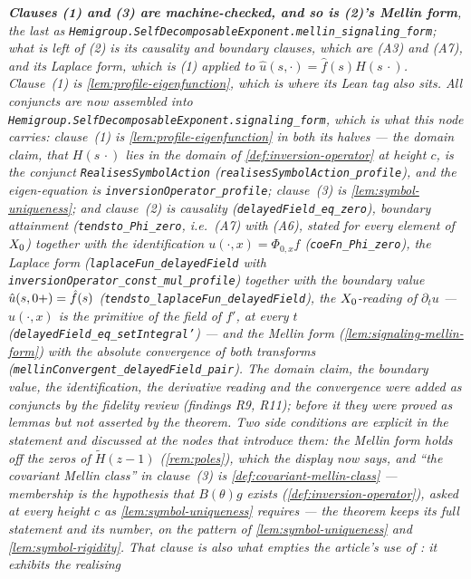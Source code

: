 \begin{theorem}
\emph{\textbf{Clauses (1) and (3) are machine-checked, and so is (2)'s Mellin form}, the last as
\texttt{Hemigroup.SelfDecomposableExponent.mellin\_signaling\_form}; what is left of (2) is its
causality and boundary clauses, which are (A3) and (A7), and its Laplace form, which is (1)
applied to $\hat u(s,\cdot) = \hat f(s)H(s\,\cdot)$. Clause~(1) is \ref{lem:profile-eigenfunction},
which is where its Lean tag also sits. All conjuncts are now assembled into
\texttt{Hemigroup.SelfDecomposableExponent.signaling\_form}, which is what this node carries:
clause~(1) is \ref{lem:profile-eigenfunction} in both its halves --- the domain claim, that
$H(s\,\cdot)$ lies in the domain of \ref{def:inversion-operator} at height $c$, is the conjunct
\texttt{RealisesSymbolAction} (\texttt{realisesSymbolAction\_profile}), and the eigen-equation is
\texttt{inversionOperator\_profile}; clause~(3) is \ref{lem:symbol-uniqueness}; and clause~(2) is
causality (\texttt{delayedField\_eq\_zero}), boundary attainment (\texttt{tendsto\_Phi\_zero}, i.e.\
(A7) with (A6), stated for every element of $X_0$) together with the identification
$u(\cdot,x) = \Phi_{0,x}f$ (\texttt{coeFn\_Phi\_zero}), the Laplace form
(\texttt{laplaceFun\_delayedField} with \texttt{inversionOperator\_const\_mul\_profile}) together
with the boundary value $\hat u(s,0{+}) = \hat f(s)$ (\texttt{tendsto\_laplaceFun\_delayedField}),
the $X_0$-reading of $\partial_t u$ --- $u(\cdot,x)$ is the primitive of the field of $f'$, at
every $t$ (\texttt{delayedField\_eq\_setIntegral'}) --- and the Mellin form
(\ref{lem:signaling-mellin-form}) with the absolute convergence of both transforms
(\texttt{mellinConvergent\_delayedField\_pair}). The domain claim, the boundary value, the
identification, the derivative reading and the convergence were added as conjuncts by the fidelity
review (findings R9, R11); before it they were proved as lemmas but not asserted by the theorem.
Two side conditions are explicit in the statement and discussed at the nodes that introduce them:
the Mellin form holds off the zeros of $\tilde H(z-1)$ (\ref{rem:poles}), which the display now
says, and ``the covariant Mellin class'' in clause~(3) is \ref{def:covariant-mellin-class} ---
membership is the hypothesis that $B(\theta)g$ exists (\ref{def:inversion-operator}), asked at
every height $c$ as \ref{lem:symbol-uniqueness} requires --- the theorem keeps its full statement
and its number, on the pattern of \ref{lem:symbol-uniqueness} and \ref{lem:symbol-rigidity}. That
clause is also what empties the article's use of \ledger{A12}: it \emph{exhibits} the realising
}
\end{theorem}
